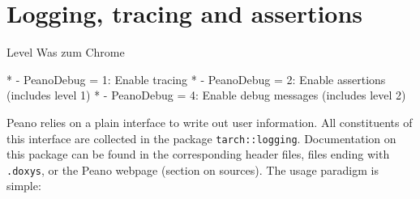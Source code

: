 \section{Logging, tracing and assertions}
\label{section:logging}








Level
Was zum Chrome

 * - PeanoDebug = 1: Enable tracing
 * - PeanoDebug = 2: Enable assertions (includes level 1)
 * - PeanoDebug = 4: Enable debug messages (includes level 2)



Peano relies on a plain interface to write out user information. 
All constituents of this interface are collected in the package
\texttt{tarch::logging}.
Documentation on this package can be found in the corresponding header files,
files ending with \texttt{.doxys}, or the Peano webpage (section on sources).
The usage paradigm is simple:

